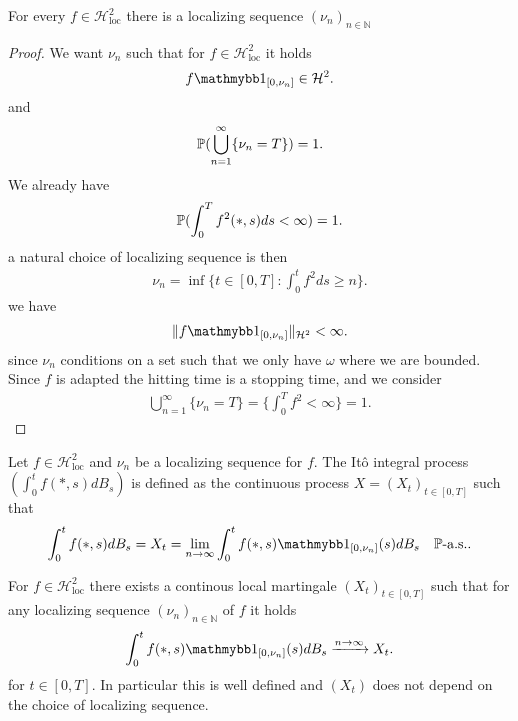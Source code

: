 \begin{Prop}[3.13]
  For every $f \in  \mathcal{H}^2_{\text{loc}}$  there is a localizing sequence $(\nu_n)_{n \in  \mathbb{N}}$
\end{Prop}
\begin{proof}
  We want $\nu_n$ such that for $f \in  \mathcal{H}^2_{\text{loc}}$ it holds 
  \begin{align*}
    f \cha_{[0,\nu_n]} \in  \mathcal{H}^2
  .\end{align*}
  and 
  \begin{align*}
    \P(\bigcup_{n=1}^{\infty} \{\nu_n = T\}   ) = 1
  .\end{align*}
  We already have 
  \begin{align*}
    \P(\int_0^{T} f^2(*,s) ds < \infty) = 1 
  .\end{align*}
  a natural choice of localizing sequence is then 
  \begin{align*}
    \nu_n = \inf \{t \in  [0,T] : \int_0^{t}  f^2 ds \ge  n\}  
  .\end{align*}
 we have
  \begin{align*}
    \|f\cha_{[0,\nu_n]}\|_{\mathcal{H}^2} < \infty
  .\end{align*}
  since $\nu_n$ conditions on a set such that we only have $\omega$ where we are bounded.
  Since $f$ is adapted the hitting time is a stopping time, and we consider
  \begin{align*}
    \bigcup_{n=1}^{\infty} \{\nu_n = T\}  =  \{\int_0^{T} f^2  < \infty\}   = 1
  .\end{align*}
\end{proof}
\begin{Definition}[3.14]
  Let $f \in  \mathcal{H}^2_{\text{loc}} $ and $\nu_n$ be a localizing sequence for $f$. The It\^o integral process 
  $(\int_0^{t} f(*,s) dB_s )$ is defined as the continuous process $X = (X_t)_{t \in  [0,T]}$ such that 
  \begin{align*}
    \int_0^{t} f(*,s) dB_s = X_t = \lim_{n\to \infty}\int_0^{t} f(*,s) \cha_{[0,\nu_n]}(s) dB_s \quad \P\text{-a.s.}
  .\end{align*}
\end{Definition}
\begin{Theorem}[3.15]
  For $f \in  \mathcal{H}^2_{\text{loc}}$  there exists a continous local martingale $(X_t)_{t \in  [0,T]}$ such that 
  for any localizing sequence $(\nu_n)_{n \in  \mathbb{N}}$ of $f$ it holds 
  \begin{align*}
    \int_0^{t} f(*,s) \cha_{[0,\nu_n]}(s) dB_s \xrightarrow{n\to \infty}  X_t
  .\end{align*}
  for $t \in  [0,T]$. In particular this is well defined and $(X_t)$ does not depend on the choice of localizing sequence.
\end{Theorem}
